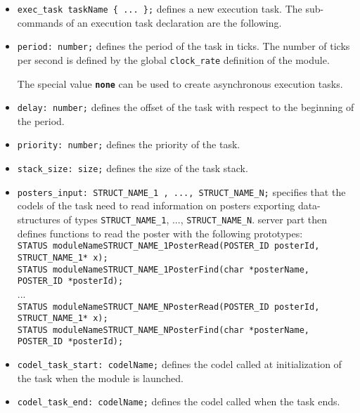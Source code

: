\begin{itemize}
\item[]\texttt{exec\_task taskName \{ ... \};} defines a new execution task. The
sub-commands of an execution task declaration are the following.

\item[]\texttt{period:  number;} defines the period of the task in
ticks. The number of ticks per second is defined by the
global \texttt{clock\_rate} definition of the module.

The special value \textbf{\texttt{none}} can be used to create asynchronous
execution tasks.

\item[]\texttt{delay:  number;} defines the offset of the task with respect to
the beginning of the period.

\item[]\texttt{priority:  number;} defines the priority of the task.

\item[]\texttt{stack\_size:  size;} defines the size of the task stack.

\item[]\texttt{posters\_input:  STRUCT\_NAME\_1 , ..., STRUCT\_NAME\_N;}
specifies that the codels of the task need to read information on posters exporting
data-structures of types \texttt{STRUCT\_NAME\_1}, ...,
\texttt{STRUCT\_NAME\_N}. {\GenoM} server part then defines functions to read
the poster with the following prototypes:\\ {\small
\texttt{STATUS moduleNameSTRUCT\_NAME\_1PosterRead(POSTER\_ID posterId,
  STRUCT\_NAME\_1* x);}\\
\texttt{STATUS moduleNameSTRUCT\_NAME\_1PosterFind(char *posterName,
  POSTER\_ID *posterId);}\\
...\\
\texttt{STATUS moduleNameSTRUCT\_NAME\_NPosterRead(POSTER\_ID posterId,
  STRUCT\_NAME\_1* x);}\\
\texttt{STATUS moduleNameSTRUCT\_NAME\_NPosterFind(char *posterName,
  POSTER\_ID *posterId);}\\
}

\item[]\texttt{codel\_task\_start:  codelName;} defines the codel called at
initialization of the task when the module is launched.

\item[]\texttt{codel\_task\_end:  codelName;} defines the codel called when the task ends.


\end{itemize}
